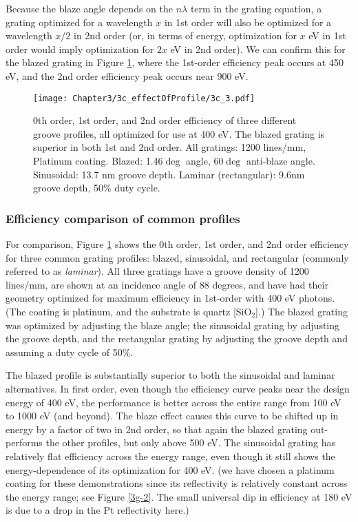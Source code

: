 Because the blaze angle depends on the $n \lambda$ term in the grating equation, a grating optimized for a wavelength $x$ in 1st order will also be optimized for a wavelength $x/2$ in 2nd order (or, in terms of energy, optimization for $x$ eV in 1st order would imply optimization for $2x$ eV in 2nd order).  We can confirm this for the blazed grating in Figure \ref{3c-plot}, where the 1st-order efficiency peak occurs at 450 eV, and the 2nd order efficiency peak occurs near 900 eV.

\begin{figure}[htbp] %
   \centering
   \texttt{[image: Chapter3/3c\_effectOfProfile/3c\_3.pdf]} 
   \caption{0th order, 1st order, and 2nd order efficiency of three different groove profiles, all optimized for use at 400 eV.  The blazed grating is superior in both 1st and 2nd order.  All gratings: 1200 lines/mm, Platinum coating.  Blazed: 1.46$\deg$ angle, 60$\deg$ anti-blaze angle.  Sinusoidal: 13.7 nm groove depth.  Laminar (rectangular): 9.6nm groove depth, 50\% duty cycle. }
   \label{3c-plot}
\end{figure}

\subsubsection{Efficiency comparison of common profiles}
For comparison, Figure \ref{3c-plot} shows the 0th order, 1st order, and 2nd order efficiency for three common grating profiles: blazed, sinusoidal, and rectangular (commonly referred to as \emph{laminar}).  All three gratings have a groove density of 1200 lines/mm, are shown at an incidence angle of 88 degrees, and have had their geometry optimized for maximum efficiency in 1st-order with 400 eV photons.  (The coating is platinum, and the substrate is quartz [SiO$_2$].)  The blazed grating was optimized by adjusting the blaze angle; the sinusoidal grating by adjusting the groove depth, and the rectangular grating by adjusting the groove depth and assuming a duty cycle of 50\%.

The blazed profile is substantially superior to both the sinusoidal and laminar alternatives.  In first order, even though the efficiency curve peaks near the design energy of 400 eV, the performance is better across the entire range from 100 eV to 1000 eV (and beyond).  The blaze effect causes this curve to be shifted up in energy by a factor of two in 2nd order, so that again the blazed grating out-performs the other profiles, but only above 500 eV.  The sinusoidal grating has relatively flat efficiency across the energy range, even though it still shows the energy-dependence of its optimization for 400 eV.   (we have chosen a platinum coating for these demonstrations since its reflectivity is relatively constant across the energy range; see Figure \ref{3g-2}.  The small universal dip in efficiency at 180 eV is due to a drop in the Pt reflectivity here.)

